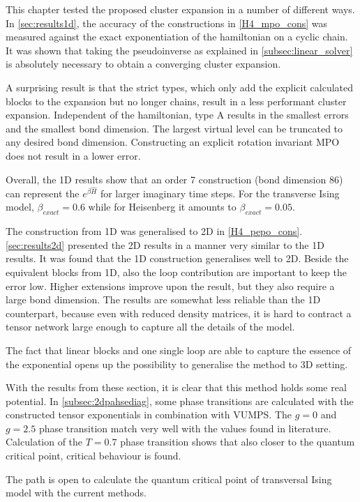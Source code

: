 This chapter tested the proposed cluster expansion in a number of different ways. In \cref{sec:results1d}, the accuracy of the constructions in \cref{H4_mpo_cons} was measured against the exact exponentiation of the hamiltonian on a cyclic chain. It was shown that taking the pseudoinverse as explained in \cref{subsec:linear_solver} is absolutely necessary to obtain a converging cluster expansion.

A surprising result is that the strict types, which only add the explicit calculated blocks to the expansion but no longer chains, result in a less performant cluster expansion. Independent of the hamiltonian, type A results in the smallest errors and the smallest bond dimension. The largest virtual level can be truncated to any desired bond dimension. Constructing an explicit rotation invariant MPO does not result in a lower error.

Overall, the 1D results show that an order 7 construction (bond dimension 86) can represent the $e^{\beta \hat{H}}$ for larger imaginary time steps. For the transverse Ising model, $\beta_{exact} = 0.6$ while for Heisenberg it amounts to $\beta_{exact} = 0.05$.

The construction from 1D was generalised to 2D in \cref{H4_pepo_cons}. \cref{sec:results2d} presented the 2D results in a manner very similar to the 1D results. It was found that the 1D construction generalises well to 2D. Beside the equivalent blocks from 1D, also the loop contribution are important to keep the error low. Higher extensions improve upon the result, but they also require a large bond dimension. The results are somewhat less reliable than the 1D counterpart, because even with reduced density matrices, it is hard to contract a tensor network large enough to capture all the details of the model.

The fact that linear blocks and one single loop are able to capture the essence of the exponential opens up the possibility to generalise the method to 3D setting.

With the results from these section, it is clear that this method holds some real potential. In \cref{subsec:2dpahsediag}, some phase transitions are calculated with the constructed tensor exponentials in combination with VUMPS. The $g=0$ and $g=2.5$ phase transition match very well with the values found in literature. Calculation of the $T=0.7$ phase transition shows that also closer to the quantum critical point, critical behaviour is found.

The path is open to calculate the quantum critical point of transversal Ising model with the current methods.